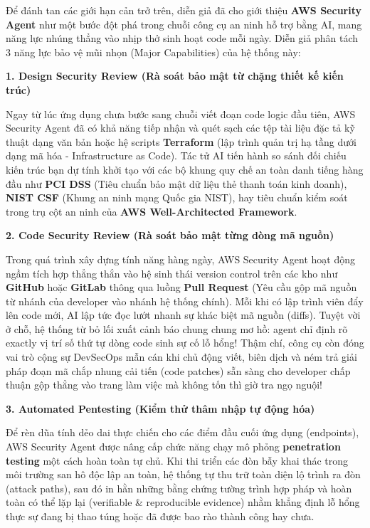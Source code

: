 Để đánh tan các giới hạn cản trở trên, diễn giả đã cho giới thiệu
\textbf{AWS Security Agent} như một bước đột phá trong chuỗi công cụ an
ninh hỗ trợ bằng AI, mang năng lực nhúng thẳng vào nhịp thở sinh hoạt
code mỗi ngày. Diễn giả phân tách 3 năng lực bảo vệ mũi nhọn (Major
Capabilities) của hệ thống này:

\vspace{0.5em}\noindent\textbf{1. Design Security Review (Rà soát bảo mật từ chặng thiết
kế kiến
trúc)}\par

Ngay từ lúc ứng dụng chưa bước sang chuỗi viết đoạn code logic đầu tiên,
AWS Security Agent đã có khả năng tiếp nhận và quét sạch các tệp tài
liệu đặc tả kỹ thuật dạng văn bản hoặc hệ scripts \textbf{Terraform}
(lập trình quản trị hạ tầng dưới dạng mã hóa - Infrastructure as Code).
Tác tử AI tiến hành so sánh đối chiếu kiến trúc bạn dự tính khởi tạo với
các bộ khung quy chế an toàn danh tiếng hàng đầu như \textbf{PCI DSS}
(Tiêu chuẩn bảo mật dữ liệu thẻ thanh toán kinh doanh), \textbf{NIST
CSF} (Khung an ninh mạng Quốc gia NIST), hay tiêu chuẩn kiểm soát trong
trụ cột an ninh của \textbf{AWS Well-Architected Framework}.

\vspace{0.5em}\noindent\textbf{2. Code Security Review (Rà soát bảo mật từng dòng mã
nguồn)}\par

Trong quá trình xây dựng tính năng hàng ngày, AWS Security Agent hoạt
động ngầm tích hợp thẳng thắn vào hệ sinh thái version control trên các
kho như \textbf{GitHub} hoặc \textbf{GitLab} thông qua luồng
\textbf{Pull Request} (Yêu cầu gộp mã nguồn từ nhánh của developer vào
nhánh hệ thống chính). Mỗi khi có lập trình viên đẩy lên code mới, AI
lập tức đọc lướt nhanh sự khác biệt mã nguồn (diffs). Tuyệt vời ở chỗ,
hệ thống từ bỏ lối xuất cảnh báo chung chung mơ hồ: agent chỉ định rõ
exactly vị trí số thứ tự dòng code sinh sự cố lỗ hổng! Thậm chí, công cụ
còn đóng vai trò cộng sự DevSecOps mẫn cán khi chủ động viết, biên dịch
và ném trả giải pháp đoạn mã chắp nhung cải tiến (code patches) sẵn sàng
cho developer chấp thuận gộp thẳng vào trang làm việc mà không tốn thì
giờ tra ngọ nguội!

\vspace{0.5em}\noindent\textbf{3. Automated Pentesting (Kiểm thử thâm nhập tự động
hóa)}\par

Để rèn dũa tính dẻo dai thực chiến cho các điểm đầu cuối ứng dụng
(endpoints), AWS Security Agent được nâng cấp chức năng chạy mô phỏng
\textbf{penetration testing} một cách hoàn toàn tự chủ. Khi thi triển
các đòn bẫy khai thác trong môi trường san hô độc lập an toàn, hệ thống
tự thu trữ toàn diện lộ trình ra đòn (attack paths), sau đó in hằn những
bằng chứng tường trình hợp pháp và hoàn toàn có thể lặp lại (verifiable
\& reproducible evidence) nhằm khẳng định lỗ hổng thực sự đang bị thao
túng hoặc đã được bao rào thành công hay chưa.

